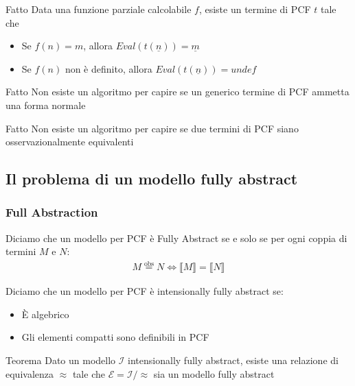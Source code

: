 \documentclass{beamer}
\newcommand{\eqobs}{\stackrel{\text{obs}}{=}}
\begin{document}
\begin{frame}
	
	\begin{block}{Fatto}
		Data una funzione parziale calcolabile $f$, esiste un termine di PCF $t$ tale che
		\begin{itemize}
			\item Se $f(n)=m$, allora $Eval(t(\underline{n}))=\underline{m}$
			\item Se $f(n)$ non è definito, allora $Eval(t(\underline{n}))=undef$
		\end{itemize}

	\end{block}
	
	\begin{block}{Fatto}
		Non esiste un algoritmo per capire se un generico termine di PCF ammetta una forma normale
	\end{block}
	
	\begin{block}{Fatto}
		Non esiste un algoritmo per capire se due termini di PCF siano osservazionalmente equivalenti
	\end{block}

	
\end{frame}



\subsection{Il problema di un modello fully abstract}
\begin{frame}
	
	\frametitle{Full Abstraction}
	
	\begin{block}{}
	Diciamo che un modello per PCF è Fully Abstract se e solo se per ogni coppia di termini $M$ e $N$:
	\begin{gather*}
		M \eqobs N \Leftrightarrow \llbracket M \rrbracket = \llbracket N \rrbracket
	\end{gather*}
	\end{block}
	
	\begin{block}{}
	Diciamo che un modello per PCF è intensionally fully abstract se:
	\begin{itemize}
		\item È algebrico
		\item Gli elementi compatti sono definibili in PCF
	\end{itemize}
	\end{block}
	
	\begin{block}{Teorema}
		Dato un modello $\mathcal{I}$ intensionally fully abstract, esiste una relazione di equivalenza $\approx$ tale che $\mathcal{E}=\mathcal{I}/ \approx$ sia un modello fully abstract
	\end{block}
	

\end{frame}
\end{document}
